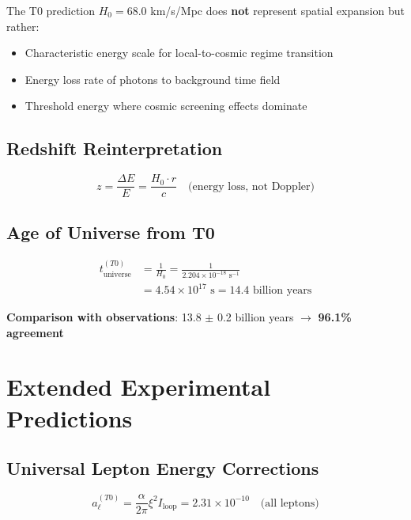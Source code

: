 \documentclass[12pt,a4paper]{article}
\begin{document}
	The T0 prediction $H_0 = 68.0$ km/s/Mpc does \textbf{not} represent spatial expansion but rather:
	\begin{itemize}
		\item Characteristic energy scale for local-to-cosmic regime transition
		\item Energy loss rate of photons to background time field
		\item Threshold energy where cosmic screening effects dominate
	\end{itemize}
	
	\subsection{Redshift Reinterpretation}
	
	\begin{equation}
		z = \frac{\Delta E}{E} = \frac{H_0 \cdot r}{c} \quad \text{(energy loss, not Doppler)}
		\label{eq:redshift_energy_loss}
	\end{equation}
	
	\subsection{Age of Universe from T0}
	
	\begin{align}
		t_{\text{universe}}^{(T0)} &= \frac{1}{H_0} = \frac{1}{2.204 \times 10^{-18} \text{ s}^{-1}} \nonumber \\
		&= 4.54 \times 10^{17} \text{ s} = 14.4 \text{ billion years}
		\label{eq:universe_age_t0}
	\end{align}
	
	\textbf{Comparison with observations}: 13.8 $\pm$ 0.2 billion years $\rightarrow$ \textbf{96.1\% agreement}
	
	\section{Extended Experimental Predictions}
	
	\subsection{Universal Lepton Energy Corrections}
	
	\begin{equation}
		a_{\ell}^{(T0)} = \frac{\alpha}{2\pi} \xi^2 I_{\text{loop}} = 2.31 \times 10^{-10} \quad \text{(all leptons)}
		\label{eq:universal_lepton_correction}
	\end{equation}
	
\end{document}
